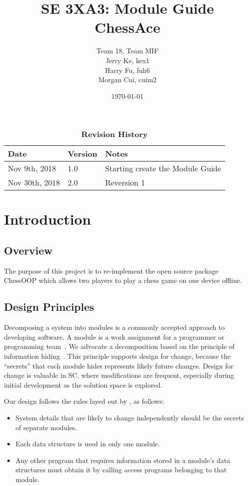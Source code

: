 \documentclass[12pt, titlepage]{article}
\title{SE 3XA3: Module Guide\\ChessAce}
\author{Team 18, Team MIF
		\\ Jerry Ke, kex1
		\\ Harry Fu, fuh6
		\\ Morgan Cui, cuim2
}
\date{\today}
\begin{document}
\maketitle

\tableofcontents
\listoftables
\listoffigures

\begin{table}[bp]
\caption{\bf Revision History}
\color{red}
\begin{tabularx}{\textwidth}{p{3cm}p{2cm}X}
\toprule {\bf Date} & {\bf Version} & {\bf Notes}\\
\midrule
Nov 9th, 2018 & 1.0 & Starting create the Module Guide \\
Nov 30th, 2018 & 2.0 & Reversion 1\\
\bottomrule
\end{tabularx}
\end{table}




\section{Introduction}

\subsection{Overview}
The purpose of this project is to re-implement the open source package ChessOOP which allows two players to play a chess game on one device offline.

\subsection{Design Principles}
Decomposing a system into modules is a commonly accepted approach to developing
software.  A module is a work assignment for a programmer or programming
team~\citep{ParnasEtAl1984}.  We advocate a decomposition
based on the principle of information hiding~\citep{Parnas1972a}.  This
principle supports design for change, because the ``secrets'' that each module
hides represents likely future changes.  Design for change is valuable in SC,
where modifications are frequent, especially during initial development as the
solution space is explored.  ~\citep{Bokahari2018}

Our design follows the rules layed out by \citet{ParnasEtAl1984}, as follows:
\begin{itemize}
\item System details that are likely to change independently should be the
  secrets of separate modules.
\item Each data structure is used in only one module.
\item Any other program that requires information stored in a module's data
  structures must obtain it by calling access programs belonging to that module.
\end{itemize}
\end{document}
